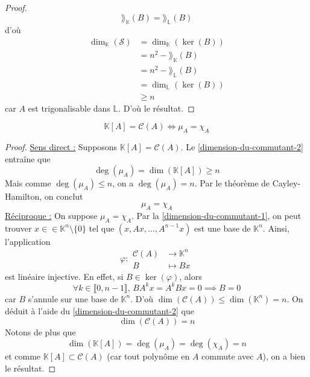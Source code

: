 \begin{proof}
		\[ \rang_{\mathbb{K}}(B) = \rang_{\mathbb{L}}(B) \]
		d'où
		\begin{align*}
			\dim_{\mathbb{K}}(\mathcal{S}) &= \dim_{\mathbb{K}}(\ker(B)) \\
			&= n^2 - \rang_{\mathbb{K}}(B) \\
			&= n^2 - \rang_{\mathbb{L}}(B) \\
			&= \dim_{\mathbb{L}}(\ker(B)) \\
			&\geq n
		\end{align*}
		car $A$ est trigonalisable dans $\mathbb{L}$. D'où le résultat.
	\end{proof}

	\begin{theorem}
		\[ \mathbb{K}[A] = \mathcal{C}(A) \iff \mu_A = \chi_A \]
	\end{theorem}

	\begin{proof}
		\uline{Sens direct :} Supposons $\mathbb{K}[A] = \mathcal{C}(A)$. Le \cref{dimension-du-commutant-2} entraîne que
		\[ \deg(\mu_A) = \dim(\mathbb{K}[A]) \geq n \]
		Mais comme $\deg(\mu_A) \leq n$, on a $\deg(\mu_A) = n$. Par le théorème de Cayley-Hamilton, on conclut
		\[ \mu_A = \chi_A \]
		\uline{Réciproque :} On suppose $\mu_A = \chi_A$. Par la \cref{dimension-du-commutant-1}, on peut trouver $x \in \in \mathbb{K}^n \setminus \{ 0 \}$ tel que $(x, Ax, \dots, A^{n-1}x)$ est une base de $\mathbb{K}^n$. Ainsi, l'application
		\[ \varphi :
		\begin{array}{cl}
			\mathcal{C}(A) &\rightarrow \mathbb{K}^n \\
			B &\mapsto Bx
		\end{array}
		\]
		est linéaire injective. En effet, si $B \in \ker(\varphi)$, alors
		\[ \forall k \in \llbracket 0, n-1 \rrbracket, \, BA^kx = A^kBx = 0 \implies B = 0 \]
		car $B$ s'annule sur une base de $\mathbb{K}^n$. D'où $\dim(\mathcal{C}(A)) \leq \dim(\mathbb{K}^n) = n$. On déduit à l'aide du \cref{dimension-du-commutant-2} que
		\[ \dim(\mathcal{C}(A)) = n \]
		Notons de plus que
		\[ \dim(\mathbb{K}[A]) = \deg(\mu_A) = \deg(\chi_A) = n \]
		et comme $\mathbb{K}[A] \subset \mathcal{C}(A)$ (car tout polynôme en $A$ commute avec $A$), on a bien le résultat.
	\end{proof}

